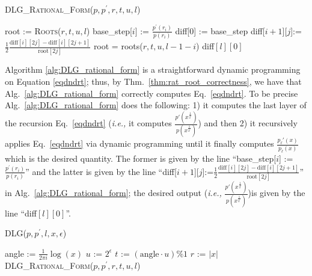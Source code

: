 \documentclass[sigconf]{acmart}
\begin{document}
\begin{algorithm}
\caption{\textsc{DLG\_Rational\_Form}($p,p^\prime,r,t,u,l$)}
\label{alg:DLG_rational_form}
\begin{algorithmic}
\STATE 	root      := \textsc{Roots}($r,t,u,l$)
\STATE 	base\_step[$i$] := $\frac{p^\prime(r_i)}{p(r_i)}$
\ENDFOR
\STATE  diff[0]   := base\_step
\STATE 			diff[$i+1$][$j$]:=$\frac{1}{2}\frac{\text{diff}[i][2j]-\text{diff}[i][2j+1]}{\text{root}[2j]}$
\STATE 		root = roots($r,t,u,l-1-i$)
\ENDFOR
\ENDFOR
\RETURN diff$[l][0]$
\end{algorithmic}
\end{algorithm}
Algorithm \ref{alg:DLG_rational_form} is a straightforward dynamic programming on Equation \ref{eqdndrt}; thus, by Thm.~\ref{thm:rat_root_correctness}, we have that Alg.~\ref{alg:DLG_rational_form} correctly computes Eq.~\ref{eqdndrt}.
To be precise Alg.~\ref{alg:DLG_rational_form} does the following: 1) it computes the last layer of the recursion Eq.~\ref{eqdndrt} (\emph{i.e.,} it computes $\frac{p'(x^{\frac{1}{2^l}})}{p(x^{\frac{1}{2^l}})}$) and then 2) it recursively applies Eq.~\ref{eqdndrt} via dynamic programming until it finally computes $\frac{p_{\ell}'(x)}{p_{\ell}(x)}$ which is the desired quantity.
The former is given by the line ``base\_step[$i$] := $\frac{p^\prime(r_i)}{p(r_i)}$'' and the latter is given by the line ``diff[$i+1$][$j$]:=$\frac{1}{2}\frac{\text{diff}[i][2j]-\text{diff}[i][2j+1]}{\text{root}[2j]}$'' in Alg.~\ref{alg:DLG_rational_form}; the desired output (\emph{i.e.,} $\frac{p'(x^{\frac{1}{2^l}})}{p(x^{\frac{1}{2^l}})}$)is given by the line ``diff$[l][0]$''.




\begin{algorithm}
\caption{\textsc{DLG}($p,p^\prime,l,x, \epsilon$)}
\label{alg:rational_angle_approx}
\begin{algorithmic}
\STATE angle     := $\frac{1}{2\pi i} \log (x)$
\STATE $u $    := $2^{\epsilon}$
\STATE$t$      :=  $(\text{angle} \cdot u)\% 1$
\STATE $r$      := $|x|$
\RETURN \textsc{DLG\_Rational\_Form}($p,p^\prime,r,t,u,l$)
\end{algorithmic}
\end{algorithm}

%




\end{document}
